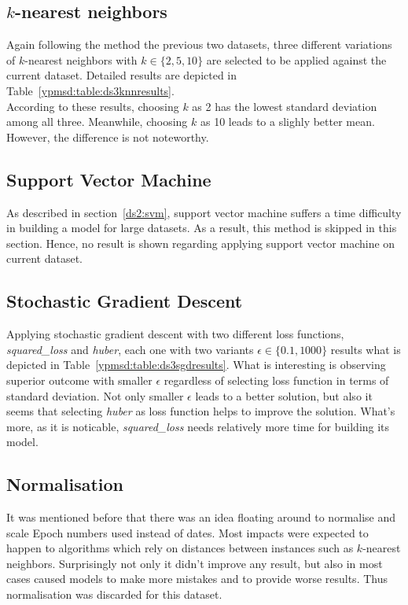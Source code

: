 \subsection{$k$-nearest neighbors}

Again following the method the previous two
datasets, three different variations of $k$-nearest neighbors with
$k\in\{2, 5, 10\}$ are selected to be applied against the current dataset. Detailed
results are depicted in Table~\ref{ypmsd:table:ds3knnresults}.\\
According to these results, choosing $k$ as 2 has the lowest standard deviation
among all three. Meanwhile, choosing $k$ as 10 leads to a slighly better mean.
However, the difference is not noteworthy.


\subsection{Support Vector Machine}

As described in section~\ref{ds2:svm}, support vector machine suffers a time
difficulty in building a model for large datasets. As a result, this method is skipped in
this section. Hence, no result is shown regarding applying support vector
machine on current dataset.

\subsection{Stochastic Gradient Descent}

Applying stochastic gradient descent with two different loss functions, {\it
squared\_loss} and {\it huber}, each one with two variants $\epsilon \in
\{0.1, 1000\}$ results what is depicted in
Table~\ref{ypmsd:table:ds3sgdresults}. What is interesting is observing superior
outcome with smaller $\epsilon$ regardless of selecting loss function in terms
of standard deviation. Not only smaller $\epsilon$ leads to a better solution,
but also it seems that selecting {\it huber} as loss function helps to improve
the solution.
What's more, as it is noticable, {\it squared\_loss} needs relatively more time
for building its model.

\subsection{Normalisation}
It was mentioned before that there was an idea floating around to normalise
and scale Epoch numbers used instead of dates. Most impacts were
expected to happen to algorithms which rely on distances between instances such
as $k$-nearest neighbors. Surprisingly not only it didn't
improve any result, but also in most cases caused models to make more mistakes
and to provide worse results. Thus normalisation was discarded for this
dataset.

